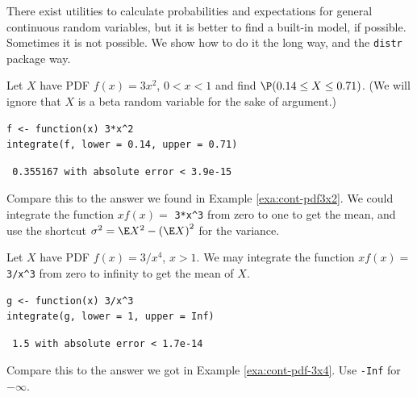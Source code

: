 \documentclass[captions=tableheading]{scrbook}
\begin{document}
There exist utilities to calculate probabilities and expectations for general continuous random variables, but it is better to find a built-in model, if possible. Sometimes it is not possible. We show how to do it the long way, and the \texttt{distr} package way.

\begin{example}
Let \(X\) have PDF \(f(x)=3x^{2}\), \(0<x<1\) and find \(\P(0.14\leq X\leq0.71)\). (We will ignore that \(X\) is a beta random variable for the sake of argument.)


\begin{verbatim}
f <- function(x) 3*x^2
integrate(f, lower = 0.14, upper = 0.71)
\end{verbatim}

\begin{verbatim}
 0.355167 with absolute error < 3.9e-15
\end{verbatim}

Compare this to the answer we found in Example \ref{exa:cont-pdf3x2}. We could integrate the function \(xf(x)=\) \texttt{3*x\textasciicircum{}3} from zero to one to get the mean, and use the shortcut \(\sigma^{2}=\E X^{2}-\left(\E X\right)^{2}\) for the variance. 

\end{example}

\begin{example}
Let \(X\) have PDF \(f(x)=3/x^{4}\), \(x>1\). We may integrate the function \(xf(x)=\) \texttt{3/x\textasciicircum{}3} from zero to infinity to get the mean of \(X\).


\begin{verbatim}
g <- function(x) 3/x^3
integrate(g, lower = 1, upper = Inf)
\end{verbatim}

\begin{verbatim}
 1.5 with absolute error < 1.7e-14
\end{verbatim}

Compare this to the answer we got in Example \ref{exa:cont-pdf-3x4}. Use \texttt{-Inf} for \(-\infty\).

\end{example}
\end{document}
